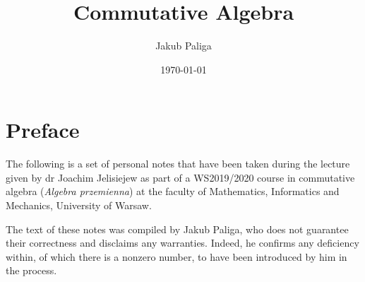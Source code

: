 \author{Jakub Paliga}
\subject{Lecture notes for}
\title{Commutative Algebra}
\date{\today}

\maketitle

\section{Preface}
The following is a set of personal notes that have been taken during the lecture given by dr Joachim Jelisiejew as part of a WS2019/2020 course in commutative algebra (\textit{Algebra przemienna}) at the faculty of Mathematics, Informatics and Mechanics, University of Warsaw.

The text of these notes was compiled by Jakub Paliga, who does not guarantee their correctness and disclaims any warranties. Indeed, he confirms any deficiency within, of which there is a nonzero number, to have been introduced by him in the process.



